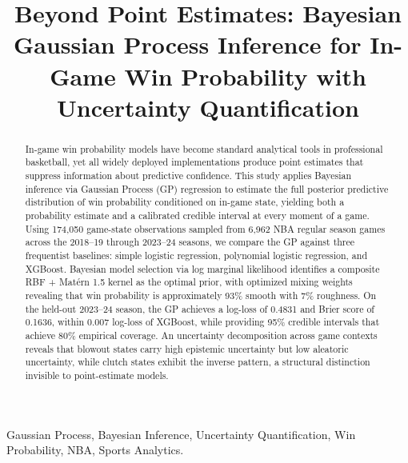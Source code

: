 \documentclass[conference]{IEEEtran}
\begin{document}
\title{Beyond Point Estimates: Bayesian Gaussian Process Inference for In-Game Win Probability with Uncertainty Quantification}

\author{
}

\maketitle

\begin{abstract}
In-game win probability models have become standard analytical tools in professional basketball, yet all widely deployed implementations produce point estimates that suppress information about predictive confidence. This study applies Bayesian inference via Gaussian Process (GP) regression to estimate the full posterior predictive distribution of win probability conditioned on in-game state, yielding both a probability estimate and a calibrated credible interval at every moment of a game. Using 174,050 game-state observations sampled from 6,962 NBA regular season games across the 2018--19 through 2023--24 seasons, we compare the GP against three frequentist baselines: simple logistic regression, polynomial logistic regression, and XGBoost. Bayesian model selection via log marginal likelihood identifies a composite RBF + Mat\'{e}rn 1.5 kernel as the optimal prior, with optimized mixing weights revealing that win probability is approximately 93\% smooth with 7\% roughness. On the held-out 2023--24 season, the GP achieves a log-loss of 0.4831 and Brier score of 0.1636, within 0.007 log-loss of XGBoost, while providing 95\% credible intervals that achieve 80\% empirical coverage. An uncertainty decomposition across game contexts reveals that blowout states carry high epistemic uncertainty but low aleatoric uncertainty, while clutch states exhibit the inverse pattern, a structural distinction invisible to point-estimate models.
\end{abstract}

\begin{IEEEkeywords}
Gaussian Process, Bayesian Inference, Uncertainty Quantification, Win Probability, NBA, Sports Analytics.
\end{IEEEkeywords}
\end{document}
